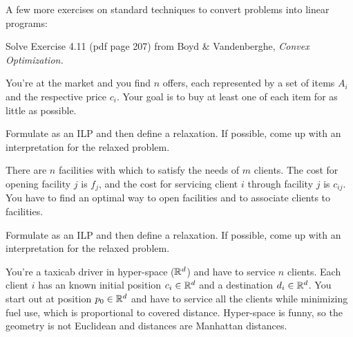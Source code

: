 

\renewcommand{\course}{Optimization}
\renewcommand{\coursepicture}{optim}
\renewcommand{\coursedate}{Summer 2015}
\renewcommand{\exnum}{8}

\exercises
{}
\exercisestitle



A few more exercises on standard techniques to convert problems into linear programs:

Solve Exercise 4.11 (pdf page 207) from  Boyd \& Vandenberghe,
\emph{Convex Optimization.}



You're at the market and you find $n$ offers, each represented by a set of
items $A_i$ and the respective price $c_i$. Your goal is to buy at least one of
each item for as little as possible.

Formulate as an ILP and then define a relaxation. If possible, come up with an
interpretation for the relaxed problem.



There are $n$ facilities with which to satisfy the needs of $m$ clients.  The
cost for opening facility $j$ is $f_j$, and the cost for servicing client $i$
through facility $j$ is $c_{ij}$.  You have to find an optimal way to open
facilities and to associate clients to facilities.

Formulate as an ILP and then define a relaxation. If possible, come up with an
interpretation for the relaxed problem.



You're a taxicab driver in hyper-space (${\mathbb{R}}^d$) and have to service $n$
clients.  Each client $i$ has an known initial position $c_i\in{\mathbb{R}}^d$ and a
destination $d_i\in{\mathbb{R}}^d$.  You start out at position $p_0\in{\mathbb{R}}^d$ and have
to service all the clients while minimizing fuel use, which is proportional to
covered distance.  Hyper-space is funny, so the geometry is not Euclidean and
distances are Manhattan distances.

